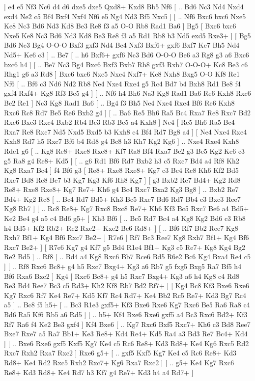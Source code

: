 \makegametitle 
|   e4   e5    Nf3   Nc6    d4   d6    dxe5   dxe5    Qxd8+   Kxd8    Bb5   Nf6 [ .. Bd6  Nc3 Nd4  Nxd4 exd4  Ne2 c5  Bf4 Bxf4  Nxf4 Nf6  e5 Ng4  Nd3 Bf5  Nxc5   ]  [ .. Nf6  Bxc6 bxc6  Nxe5 Ke8  Nc3 Bd6  Nd3 Kd8  Be3 Re8  f3 a5  O-O Rb8  Rad1 Ba6   ]  Bg5 [  Bxc6 bxc6  Nxe5 Ke8  Nc3 Bd6  Nd3 Kd8  Be3 Re8  f3 a5  Rd1 Rb8  b3 Nd5  exd5 Rxe3+   ]  [  Bg5 Bd6  Nc3 Bg4  O-O-O Bxf3  gxf3 Nd4  Bc4 Nxf3  Bxf6+ gxf6  Bxf7 Ke7  Bh5 Nd4  Nd5+ Ke6  c3   ] .. Be7 [ .. h6  Bxf6+ gxf6  Nc3 Bd6  O-O-O Be6  a3 Rg8  g3 a6  Bxc6 bxc6  h4   ]  [ .. Be7  Nc3 Bg4  Bxc6 Bxf3  Bxb7 Rb8  gxf3 Rxb7  O-O-O+ Kc8  Be3 c6  Rhg1 g6  a3 Rd8   ]  Bxc6   bxc6    Nxe5   Nxe4    Nxf7+   Ke8    Nxh8   Bxg5    O-O   Kf8    Re1   Nf6 [ .. Bf6  c3 Nd6  Nd2 Rb8  Ne4 Nxe4  Rxe4 g5  Rc4 Bd7  b4 Bxh8  Rd1 Be8  f4 gxf4  Rxf4+ Kg8  Rf3 Be5  g4   ]  [ .. Nf6  h4 Bh6  Na3 Kg8  Rad1 Ba6  Re6 Kxh8  Rxc6 Be2  Re1   ]  Nc3   Kg8    Rad1   Ba6 [ .. Bg4  f3 Bh5  Ne4 Nxe4  Rxe4 Bf6  Re6 Kxh8  Rxc6 Rc8  Rd7 Be5  Re6 Bxb2  g4   ]  [ .. Ba6  Re5 Bh6  Ra5 Bc4  Rxa7 Re8  Rxc7 Bd2  Rxc6 Bxc3  Rxc4 Bxb2  Rb4 Bc3  Rb3 Be5  a4 Kxh8   ]  Ne4 [  Re5 Bh6  Ra5 Bc4  Rxa7 Re8  Rxc7 Nd5  Nxd5 Bxd5  b3 Kxh8  c4 Bf4  Rd7 Bg8  a4   ]  [  Ne4 Nxe4  Rxe4 Kxh8  Rd7 h5  Rxc7 Bf6  b4 Rd8  g4 Bc8  h3 Kh7  Kg2 Kg6   ] .. Nxe4    Rxe4   Kxh8    Rde1   g6    [ .. Kg8  Re8+ Rxe8  Rxe8+ Kf7  Ra8 Bf4  Rxa7 Be2  g3 Be5  Kg2 Ke6  c3 g5  Ra8 g4  Re8+ Kd5   ]  [ .. g6  Rd1 Bf6  Rd7 Bxb2  h3 c5  Rxc7 Bd4  a4 Rf8  Kh2 Kg8  Rxa7 Bc4   ]  f4   Bf6    g3 [  Re8+ Rxe8  Rxe8+ Kg7  c3 Bc4  Rc8 Kh6  Kf2 Bd5  Rxc7 Bd8  Rc8 Be7  b3 Kg7  Kg3 Kf6  Rh8 Kg7   ]  [  g3 Bxb2  Re7 Bd4+  Kg2 Rd8  Re8+ Rxe8  Rxe8+ Kg7  Re7+ Kh6  g4 Bc4  Rxc7 Bxa2  Kg3 Bg8   ] .. Bxb2    Re7   Bd4+    Kg2   Rc8 [ .. Bc4  Rd7 Bd5+  Kh3 Bc5  Rxc7 Bd6  Rd7 Bb4  c3 Bxc3  Ree7 Kg8  Rb7   ]  [ .. Rc8  Re8+ Kg7  Rxc8 Bxc8  Re7+ Kh6  Kf3 Bc5  Rxc7 Be6  a4 Bd5+  Ke2 Be4  g4 a5  c4 Bd6  g5+   ]  Kh3   Bf6 [ .. Bc5  Rd7 Bc4  a4 Kg8  Kg2 Bd6  c3 Rb8  h4 Bd5+  Kf2 Rb2+  Re2 Rxe2+  Kxe2 Be6  Rd8+   ]  [ .. Bf6  Rf7 Bb2  Ree7 Kg8  Rxh7 Bf1+  Kg4 Bf6  Rxc7 Be2+   ]  R7e6 [  Rf7 Bc3  Ree7 Kg8  Rxh7 Bf1+  Kg4 Bf6  Rxc7 Be2+   ]  [  R7e6 Kg7  g4 Kf7  g5 Bd4  R1e4 Bf1+  Kg3 c5  Re7+ Kg8  Kg4 Bg2  Re2 Bd5   ] .. Rf8 [ .. Bd4  a4 Kg8  Rxc6 Bb7  Rce6 Bd5  R6e2 Bc6  Kg4 Bxa4  Re4 c5   ]  [ .. Rf8  Rxc6 Bc8+  g4 h5  Rxc7 Bxg4+  Kg3 a6  Rb7 g5  fxg5 Bxg5  Ra7 Bf5  h4 Bf6  Rxa6 Bxc2   ]  Kg4 [  Rxc6 Bc8+  g4 h5  Rxc7 Bxg4+  Kg3 a6  h4 Kg8  c4 Rd8  Re3 Bd4  Ree7 Bc3  c5 Rd3+  Kh2 Kf8  Rb7 Bd2  Rf7+   ]  [  Kg4 Bc8  Kf3 Bxe6  Rxe6 Kg7  Rxc6 Rf7  Ke4 Re7+  Kd5 Kf7  Rc4 Rd7+  Ke4 Bb2  Rc5 Re7+  Kd3 Bg7  Rc4 a5   ] .. Bc8    f5   h5+ [ .. Bc3  R1e3 gxf5+  Kf3 Bxe6  Rxe6 Kg7  Rxc6 Be5  Ra6 Ra8  c4 Bd6  Ra5 Kf6  Rb5 a6  Rd5   ]  [ .. h5+  Kf4 Bxe6  Rxe6 gxf5  a4 Bc3  Rxc6 Bd2+  Kf3 Rf7  Ra6 f4  Ke2 Be3  gxf4   ]  Kf4   Bxe6 [ .. Kg7  Rxc6 Bxf5  Rxc7+ Kh6  c3 Bd8  Ree7 Bxe7  Rxe7 a5  Ra7 Bb1+  Ke3 Re8+  Kd4 Re4+  Kd5 Ra4  a3 Bd3  Re7 Bc4+  Kd4   ]  [ .. Bxe6  Rxe6 gxf5  Kxf5 Kg7  Ke4 c5  Rc6 Re8+  Kd3 Rd8+  Ke4 Kg6  Rxc5 Rd2  Rxc7 Rxh2  Rxa7 Rxc2   ]  Rxe6   g5+ [ .. gxf5  Kxf5 Kg7  Ke4 c5  Rc6 Re8+  Kd3 Rd8+  Ke4 Rd2  Rxc5 Rxh2  Rxc7+ Kg6  Rxa7 Rxc2   ]  [ .. g5+  Ke4 Kg7  Rxc6 Re8+  Kd3 Rd8+  Ke4 Rd7  h3 Kf7  g4 Re7+  Kd3 h4  a4 Rd7+   ]  
